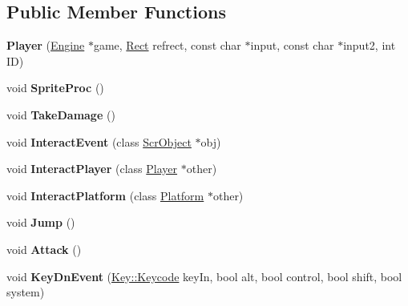 \subsection*{Public Member Functions}
\begin{DoxyCompactItemize}
\item 
\hypertarget{class_player_ae06a51f500b10368dd5ebb7853566b22}{}\label{class_player_ae06a51f500b10368dd5ebb7853566b22} 
{\bfseries Player} (\hyperlink{class_engine}{Engine} $\ast$game, \hyperlink{class_rect}{Rect} refrect, const char $\ast$input, const char $\ast$input2, int ID)
\item 
\hypertarget{class_player_afb17544a1c1d12cba93e77a25fbd27a9}{}\label{class_player_afb17544a1c1d12cba93e77a25fbd27a9} 
void {\bfseries Sprite\+Proc} ()
\item 
\hypertarget{class_player_a79060b32a95ca6e3f7a482b9ed45fa07}{}\label{class_player_a79060b32a95ca6e3f7a482b9ed45fa07} 
void {\bfseries Take\+Damage} ()
\item 
\hypertarget{class_player_aa6077bbdf83a68e49deec5425fa490a5}{}\label{class_player_aa6077bbdf83a68e49deec5425fa490a5} 
void {\bfseries Interact\+Event} (class \hyperlink{class_scr_object}{Scr\+Object} $\ast$obj)
\item 
\hypertarget{class_player_acb2790a9c737e1b9c1ab744abdcbc6a0}{}\label{class_player_acb2790a9c737e1b9c1ab744abdcbc6a0} 
void {\bfseries Interact\+Player} (class \hyperlink{class_player}{Player} $\ast$other)
\item 
\hypertarget{class_player_a89d63167bff6dac4cb9a04265908457b}{}\label{class_player_a89d63167bff6dac4cb9a04265908457b} 
void {\bfseries Interact\+Platform} (class \hyperlink{class_platform}{Platform} $\ast$other)
\item 
\hypertarget{class_player_a1334990b8b7aaaad904e22f03f4d947d}{}\label{class_player_a1334990b8b7aaaad904e22f03f4d947d} 
void {\bfseries Jump} ()
\item 
\hypertarget{class_player_a6c879db24d39d894207e078eb4c56e8d}{}\label{class_player_a6c879db24d39d894207e078eb4c56e8d} 
void {\bfseries Attack} ()
\item 
\hypertarget{class_player_ac9d22befc482bf7f2ae7956d9116baf6}{}\label{class_player_ac9d22befc482bf7f2ae7956d9116baf6} 
void {\bfseries Key\+Dn\+Event} (\hyperlink{class_key_handler_1_1_key_a832541e186986ff9f6bd5a810ed5c164}{Key\+::\+Keycode} key\+In, bool alt, bool control, bool shift, bool system)
\item 
\hypertarget{class_player_ae849a9d15bb49f8be75b792eb0ad91ff}{}\label{class_player_ae849a9d15bb49f8be75b792eb0ad91ff} 

\end{DoxyCompactItemize}
